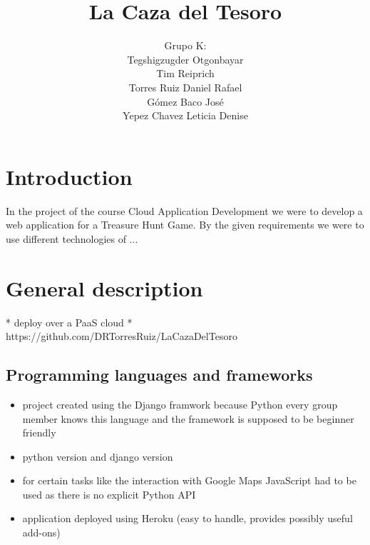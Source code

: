 \documentclass{article}
\title{La Caza del Tesoro}
\author{Grupo K: \\
	Tegshigzugder Otgonbayar \\
	Tim Reiprich \\
	Torres Ruiz Daniel Rafael \\
	Gómez Baco José \\
	Yepez Chavez Leticia Denise }
\begin{document}
\pagestyle{plain}

\maketitle



\newpage

\tableofcontents %
\newpage



\section{Introduction}
In the project of the course Cloud Application Development we were to develop a web application for a Treasure Hunt Game. By the given requirements we were to use different technologies of ...

\section{General description}

* deploy over a PaaS cloud
* https://github.com/DRTorresRuiz/LaCazaDelTesoro

\subsection{Programming languages and frameworks}
\begin{itemize}
\item project created using the Django framwork because Python every group member knows this language and the framework is supposed to be beginner friendly
\item python version and django version
\item for certain tasks like the interaction with Google Maps JavaScript had to be used as there is no explicit Python API
\item application deployed using Heroku (easy to handle, provides possibly useful add-ons)
\end{itemize}
\end{document}
